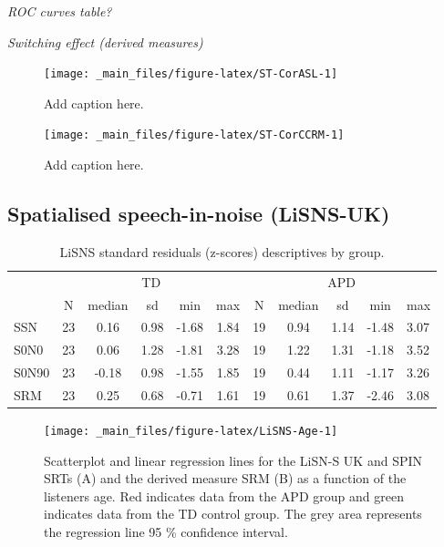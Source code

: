 \documentclass[a4paper, twoside]{templates/ociamthesis}
\begin{document}
\colorbox[HTML]{CCCCFF}{\emph{ROC curves table?}}

\colorbox[HTML]{CCCCFF}{\emph{Switching effect (derived measures)}}

\begin{figure}

{\centering \texttt{[image: \_main\_files/figure-latex/ST-CorASL-1]} 

}

\caption{Add caption here.}\label{fig:ST-CorASL}
\end{figure}

\begin{figure}

{\centering \texttt{[image: \_main\_files/figure-latex/ST-CorCCRM-1]} 

}

\caption{Add caption here.}\label{fig:ST-CorCCRM}
\end{figure}

\hypertarget{spatialised-speech-in-noise-lisns-uk-1}{%
\subsection{Spatialised speech-in-noise (LiSNS-UK)}\label{spatialised-speech-in-noise-lisns-uk-1}}

\begin{table}

\caption{\label{tab:LiSNS-ztab}LiSNS standard residuals (z-scores) descriptives by group.}
\centering
\begin{tabular}[t]{lcccccccccl}
\toprule
\multicolumn{1}{c}{ } & \multicolumn{5}{c}{TD} & \multicolumn{5}{c}{APD} \\
\cmidrule(l{3pt}r{3pt}){2-6} \cmidrule(l{3pt}r{3pt}){7-11}
 & N & median & sd & min & max & N & median & sd & min & max\\
\midrule
SSN & 23 & 0.16 & 0.98 & -1.68 & 1.84 & 19 & 0.94 & 1.14 & -1.48 & 3.07\\
S0N0 & 23 & 0.06 & 1.28 & -1.81 & 3.28 & 19 & 1.22 & 1.31 & -1.18 & 3.52\\
S0N90 & 23 & -0.18 & 0.98 & -1.55 & 1.85 & 19 & 0.44 & 1.11 & -1.17 & 3.26\\
SRM & 23 & 0.25 & 0.68 & -0.71 & 1.61 & 19 & 0.61 & 1.37 & -2.46 & 3.08\\
\bottomrule
\end{tabular}
\end{table}

\begin{figure}

{\centering \texttt{[image: \_main\_files/figure-latex/LiSNS-Age-1]} 

}

\caption{Scatterplot and linear regression lines for the LiSN-S UK and SPIN SRTs (A) and the derived measure SRM (B) as a function of the listeners age. Red indicates data from the APD group and green indicates data from the TD control group. The grey area represents the regression line 95 \% confidence interval.}\label{fig:LiSNS-Age}
\end{figure}
\end{document}
